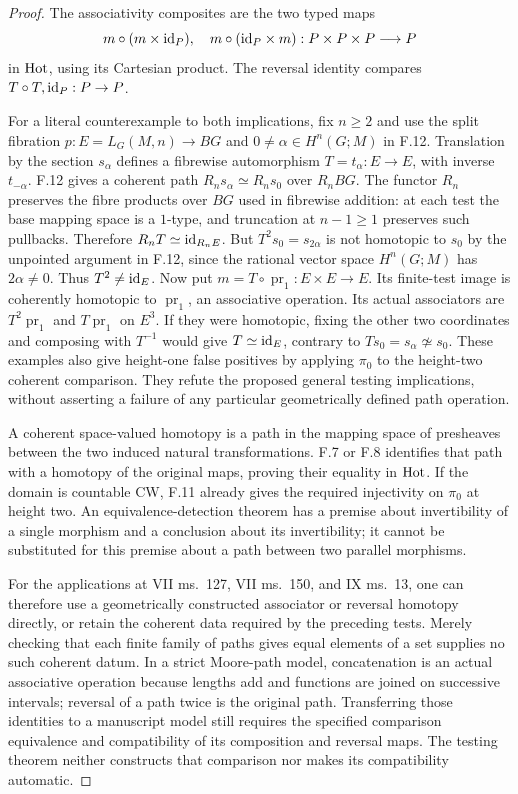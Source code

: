 \begin{proof}
The associativity composites are the two typed maps
\[
 m\circ(m\times\mathrm{id}_P),\quad m\circ(\mathrm{id}_P\times m):
                  P\times P\times P\longrightarrow P
\]
in $\mathrm{Hot}$, using its Cartesian product. The reversal identity
compares $T\circ T,\mathrm{id}_P:P\to P$.

For a literal counterexample to both implications, fix $n\geq2$
and use the split fibration $p:E=L_G(M,n)\to BG$ and
$0\ne\alpha\in H^n(G;M)$ in F.12. Translation by the section
$s_\alpha$ defines a fibrewise automorphism
$T=t_\alpha:E\to E$, with inverse $t_{-\alpha}$.
F.12 gives a coherent path $R_ns_\alpha\simeq R_ns_0$ over
$R_nBG$. The functor $R_n$ preserves the fibre products over
$BG$ used in fibrewise addition: at each test the base mapping
space is a $1$-type, and truncation at $n-1\geq1$ preserves
such pullbacks. Therefore $R_nT\simeq\mathrm{id}_{R_nE}$.
But $T^2s_0=s_{2\alpha}$ is not homotopic to $s_0$ by the
unpointed argument in F.12, since the rational vector space
$H^n(G;M)$ has $2\alpha\ne0$. Thus $T^2\ne\mathrm{id}_E$.
Now put $m=T\circ\operatorname{pr}_1:E\times E\to E$.
Its finite-test image is coherently homotopic to
$\operatorname{pr}_1$, an associative operation. Its actual
associators are $T^2\operatorname{pr}_1$ and
$T\operatorname{pr}_1$ on $E^3$. If they were homotopic,
fixing the other two coordinates and composing with $T^{-1}$
would give $T\simeq\mathrm{id}_E$, contrary to
$Ts_0=s_\alpha\not\simeq s_0$. These examples also give
height-one false positives by applying $\pi_0$ to the
height-two coherent comparison. They refute the proposed
general testing implications, without asserting a failure of
any particular geometrically defined path operation.

A coherent space-valued homotopy
is a path in the mapping space of presheaves between the two
induced natural transformations. F.7 or F.8 identifies that
path with a homotopy of the original maps, proving their
equality in $\mathrm{Hot}$. If the domain is countable CW, F.11
already gives the required injectivity on $\pi_0$ at height
two. An equivalence-detection theorem has a premise about
invertibility of a single morphism and a conclusion about its
invertibility; it cannot be substituted for this premise
about a path between two parallel morphisms.

For the applications at VII ms.~127, VII ms.~150, and IX
ms.~13, one can therefore use a geometrically constructed
associator or reversal homotopy directly, or retain the
coherent data required by the preceding tests. Merely checking
that each finite family of paths gives equal elements of a
set supplies no such coherent datum. In a strict Moore-path
model, concatenation is an actual associative operation
because lengths add and functions are joined on successive
intervals; reversal of a path twice is the original path.
Transferring those identities to a manuscript model still
requires the specified comparison equivalence and
compatibility of its composition and reversal maps. The
testing theorem neither constructs that comparison nor
makes its compatibility automatic.
\end{proof}

